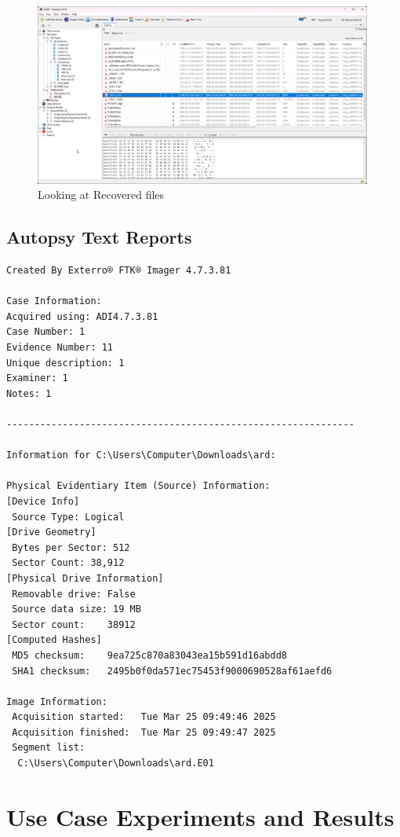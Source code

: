 \documentclass[11pt]{article}
\begin{document}
\begin{figure}[H]
    \centering
    \includegraphics[width=0.99\textwidth]{autopsy_09.png}
    \caption{Looking at Recovered files}
    \label{fig:1}
\end{figure}

\subsection{Autopsy Text Reports}

\begin{verbatim}
Created By Exterro® FTK® Imager 4.7.3.81 

Case Information: 
Acquired using: ADI4.7.3.81
Case Number: 1
Evidence Number: 11
Unique description: 1
Examiner: 1
Notes: 1

--------------------------------------------------------------

Information for C:\Users\Computer\Downloads\ard:

Physical Evidentiary Item (Source) Information:
[Device Info]
 Source Type: Logical
[Drive Geometry]
 Bytes per Sector: 512
 Sector Count: 38,912
[Physical Drive Information]
 Removable drive: False
 Source data size: 19 MB
 Sector count:    38912
[Computed Hashes]
 MD5 checksum:    9ea725c870a83043ea15b591d16abdd8
 SHA1 checksum:   2495b0f0da571ec75453f9000690528af61aefd6

Image Information:
 Acquisition started:   Tue Mar 25 09:49:46 2025
 Acquisition finished:  Tue Mar 25 09:49:47 2025
 Segment list:
  C:\Users\Computer\Downloads\ard.E01

\end{verbatim}


\section{Use Case Experiments and Results}
\end{document}
